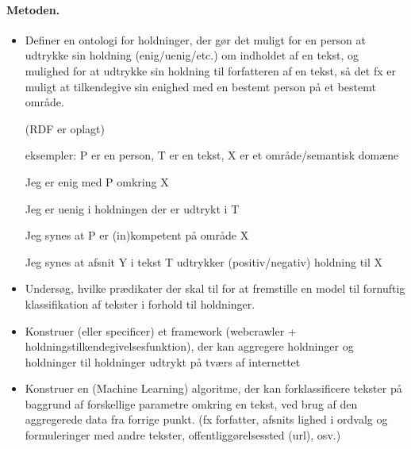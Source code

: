 \documentclass[a4paper,draft]{article}
\begin{document}
\paragraph{Metoden.} 
\begin{itemize} \item Definer en ontologi for holdninger, der gør det
muligt for en person at udtrykke sin holdning (enig/uenig/etc.) om
indholdet af en tekst, og mulighed for at udtrykke sin holdning til
forfatteren af en tekst, så det fx er muligt at tilkendegive sin enighed
med en bestemt person på et bestemt område.

(RDF er oplagt)

eksempler: P er en person, T er en tekst, X er et område/semantisk domæne

\subitem Jeg er enig med P omkring X 

\subitem Jeg er uenig i holdningen
der er udtrykt i T 

\subitem Jeg synes at P er (in)kompetent på område X

\subitem Jeg synes at afsnit Y i tekst T udtrykker (positiv/negativ)
holdning til X

\item Undersøg, hvilke prædikater der skal til for at fremstille en model
til fornuftig klassifikation af tekster i forhold til holdninger.

\item Konstruer (eller specificer) et framework (webcrawler + holdningstilkendegivelsesfunktion), der kan aggregere
holdninger og holdninger til holdninger udtrykt på tværs af internettet

\item Konstruer en (Machine Learning) algoritme, der kan forklassificere
tekster på baggrund af forskellige parametre omkring en tekst, ved brug af
den aggregerede data fra forrige punkt. (fx forfatter, afsnits lighed i
ordvalg og formuleringer med andre tekster, offentliggørelsessted (url),
osv.)
\end{itemize}
\end{document}
